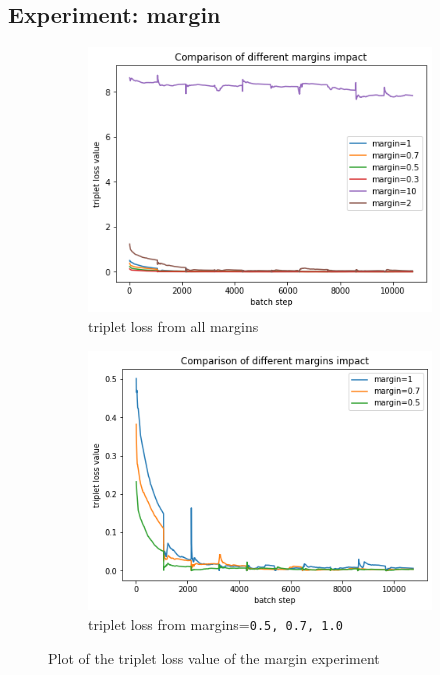 \subsection{Experiment: margin}
\begin{figure}[tb]
\centering
\begin{subfigure}{.5\linewidth}
  \centering
  \includegraphics[width=.9\linewidth]{study-doc/experiment_margin/assets/margin_all_plot.png}
  \caption{triplet loss from all margins}
  \label{fig:sub-margin-all}
\end{subfigure}%
\begin{subfigure}{.5\linewidth}
  \centering
  \includegraphics[width=.9\linewidth]{study-doc/experiment_margin/assets/margin_5_7_10_plot.png}
  \caption{triplet loss from margins=\texttt{0.5, 0.7, 1.0}}
  \label{fig:sub-margin-5-7-10}
\end{subfigure}
\caption{Plot of the triplet loss value of the margin experiment}
\label{fig:margin-experiment-triplet-loss-plot}
\end{figure}
